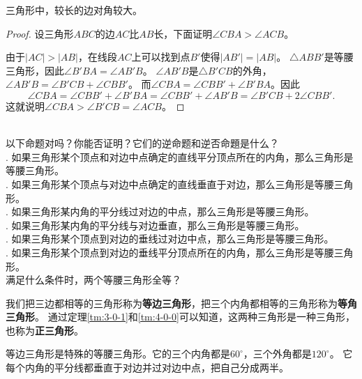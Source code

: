 \documentclass[12pt,UTF8]{ctexbook}
\begin{document}
\begin{tm}\label{tm:4-0-1}
    三角形中，较长的边对角较大。
\end{tm}

\begin{proof}
    设三角形$ABC$的边$AC$比$AB$长，下面证明$\angle CBA > \angle ACB$。

    由于$|AC| > |AB|$，在线段$AC$上可以找到点$B'$使得$|AB'| = |AB|$。
    $\triangle ABB'$是等腰三角形，因此$\angle B'BA = \angle AB'B$。
    $\angle AB'B$是$\triangle B'CB$的外角，$\angle AB'B = \angle B'CB + \angle CBB'$。
    而$\angle CBA = \angle CBB' + \angle B'BA$。因此
    $$ \angle CBA = \angle CBB' + \angle B'BA = \angle CBB' + \angle AB'B = \angle B'CB + 2\angle CBB'.$$
    这就说明$\angle CBA > \angle B'CB = \angle ACB$。
\end{proof}

\begin{sk}\label{sk:4-0-0}
    \mbox{}\\
    以下命题对吗？你能否证明？它们的逆命题和逆否命題是什么？\\
    . 如果三角形某个顶点和对边中点确定的直线平分顶点所在的内角，那么三角形是等腰三角形。\\
    . 如果三角形某个顶点与对边中点确定的直线垂直于对边，那么三角形是等腰三角形。\\
    . 如果三角形某内角的平分线过对边的中点，那么三角形是等腰三角形。\\
    . 如果三角形某内角的平分线与对边垂直，那么三角形是等腰三角形。\\
    . 如果三角形某个顶点到对边的垂线过对边中点，那么三角形是等腰三角形。\\
    . 如果三角形某个顶点到对边的垂线平分顶点所在的内角，那么三角形是等腰三角形。\\
    满足什么条件时，两个等腰三角形全等？\\
\end{sk}

我们把三边都相等的三角形称为\textbf{等边三角形}，把三个内角都相等的三角形称为\textbf{等角三角形}。
通过定理\ref{tm:3-0-1}和\ref{tm:4-0-0}可以知道，这两种三角形是一种三角形，也称为\textbf{正三角形}。

等边三角形是特殊的等腰三角形。它的三个内角都是$60^\circ$，三个外角都是$120^\circ$。
它每个内角的平分线都垂直于对边并过对边中点，把自己分成两半。
\end{document}
